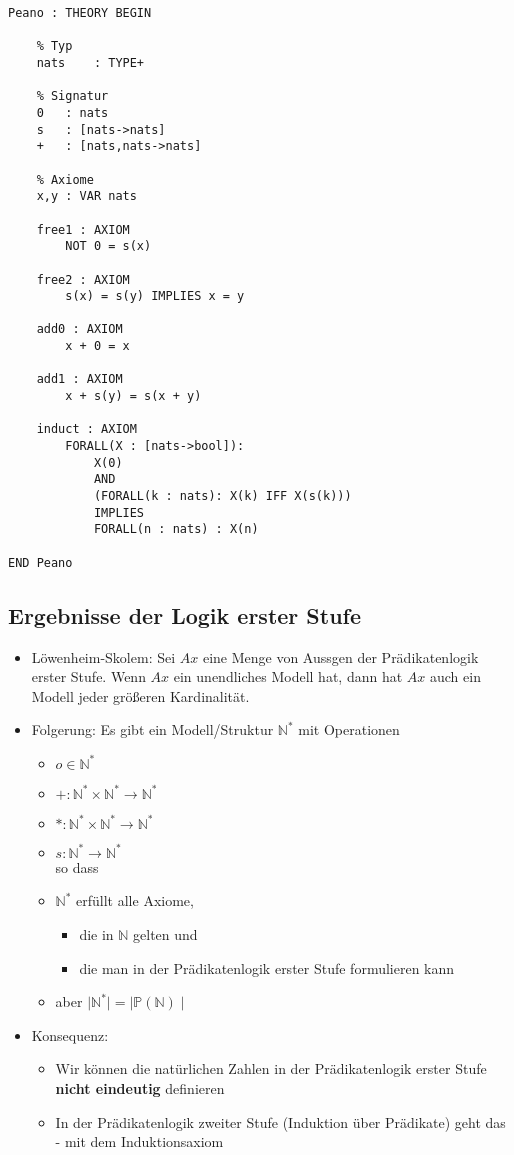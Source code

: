 \documentclass{scrartcl}
\begin{document}
\begin{lstlisting}
Peano : THEORY BEGIN

	% Typ
	nats	: TYPE+
	
	% Signatur
	0	: nats
	s	: [nats->nats]
	+	: [nats,nats->nats]
	
	% Axiome
	x,y	: VAR nats
	
	free1 : AXIOM
		NOT 0 = s(x)
		
	free2 : AXIOM
		s(x) = s(y) IMPLIES x = y
		
	add0 : AXIOM
		x + 0 = x
		
	add1 : AXIOM
		x + s(y) = s(x + y)
		
	induct : AXIOM
		FORALL(X : [nats->bool]):
			X(0)
			AND
			(FORALL(k : nats): X(k) IFF X(s(k)))
			IMPLIES
			FORALL(n : nats) : X(n)

END Peano
\end{lstlisting}

\subsection{Ergebnisse der Logik erster Stufe}

\begin{itemize}
	\item Löwenheim-Skolem: Sei $ Ax $ eine Menge von Aussgen der Prädikatenlogik erster Stufe. Wenn $ Ax $ ein unendliches Modell hat, dann hat $ Ax $ auch ein Modell jeder größeren Kardinalität.
	\item Folgerung: Es gibt ein Modell/Struktur $ \mathbb{N}^* $ mit Operationen
	\begin{itemize}
		\item $ o \in \mathbb{N}^* $
		\item $ + : \mathbb{N}^* \times \mathbb{N}^* \rightarrow \mathbb{N}^* $
		\item $ * : \mathbb{N}^* \times \mathbb{N}^* \rightarrow \mathbb{N}^* $
		\item $ s : \mathbb{N}^* \rightarrow \mathbb{N}^* $ \\
		so dass
		\item $ \mathbb{N}^* $ erfüllt alle Axiome,
		\begin{itemize}
			\item die in $ \mathbb{N} $ gelten und
			\item die man in der Prädikatenlogik erster Stufe formulieren kann
		\end{itemize}
		\item aber $ \mid \mathbb{N}^* \mid = \mid \mathbb{P}(\mathbb{N}) \mid $
	\end{itemize}
	\item Konsequenz:
	\begin{itemize}
		\item Wir können die natürlichen Zahlen in der Prädikatenlogik erster Stufe \textbf{nicht eindeutig} definieren
		\item In der Prädikatenlogik zweiter Stufe (Induktion über Prädikate) geht das - mit dem Induktionsaxiom
	\end{itemize}
\end{itemize}
\end{document}
